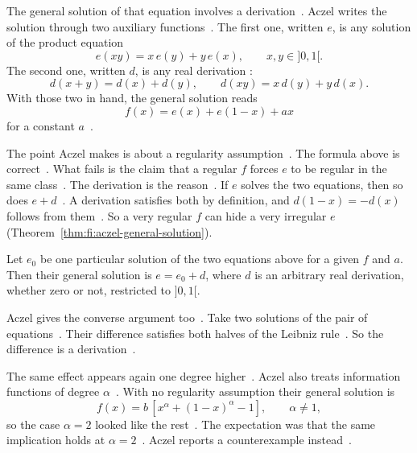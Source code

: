 The general solution of that equation involves a
derivation~\cite[p.~195]{Aczel1981}. Aczel writes the solution through two
auxiliary functions~\cite[p.~195]{Aczel1981}. The first one, written $e$, is
any solution of the product equation
\[
  e(xy) = x\,e(y) + y\,e(x), \qquad x, y \in {]0,1[} .
\]
The second one, written $d$, is any real derivation
\cite[pp.~191 and 194]{Aczel1981}:
\[
  d(x+y) = d(x) + d(y), \qquad d(xy) = x\,d(y) + y\,d(x).
\]
With those two in hand, the general solution reads
\[
  f(x) = e(x) + e(1-x) + ax
\]
for a constant $a$~\cite[p.~195]{Aczel1981}.

The point Aczel makes is about a regularity
assumption~\cite[p.~195]{Aczel1981}. The formula above is
correct~\cite[p.~195]{Aczel1981}. What fails is the claim that a regular $f$
forces $e$ to be regular in the same
class~\cite[p.~195]{Aczel1981}. The derivation is the
reason~\cite[p.~195]{Aczel1981}. If $e$ solves the two equations, then so does
$e + d$~\cite[p.~195]{Aczel1981}. A derivation satisfies both by definition,
and $d(1-x) = -d(x)$ follows from them~\cite[p.~195]{Aczel1981}. So a very
regular $f$ can hide a very irregular $e$~ (Theorem~\ref{thm:fi:aczel-general-solution})\cite[p.~195]{Aczel1981}.

\begin{theorem}\label{thm:fi:aczel-general-solution}
Let $e_0$ be one particular solution of the two equations above for a given
$f$ and $a$. Then their general solution is $e = e_0 + d$, where $d$ is an
arbitrary real derivation, whether zero or not, restricted to ${]0,1[}$.
\end{theorem}

Aczel gives the converse argument too~\cite[p.~195]{Aczel1981}. Take two
solutions of the pair of equations~\cite[p.~195]{Aczel1981}. Their difference
satisfies both halves of the Leibniz
rule~\cite[p.~195]{Aczel1981}. So the difference is a
derivation~\cite[p.~195]{Aczel1981}.

The same effect appears again one degree
higher~\cite[p.~199]{Aczel1981}. Aczel also treats information functions of
degree $\alpha$~\cite[p.~199]{Aczel1981}. With no regularity assumption their
general solution is
\[
  f(x) = b\,[x^\alpha + (1-x)^\alpha - 1], \qquad \alpha \neq 1,
\]
so the case $\alpha = 2$ looked like the
rest~\cite[pp.~198--199]{Aczel1981}. The expectation was that the same
implication holds at $\alpha = 2$~\cite[p.~199]{Aczel1981}. Aczel reports a
counterexample instead~\cite[p.~199]{Aczel1981}.

